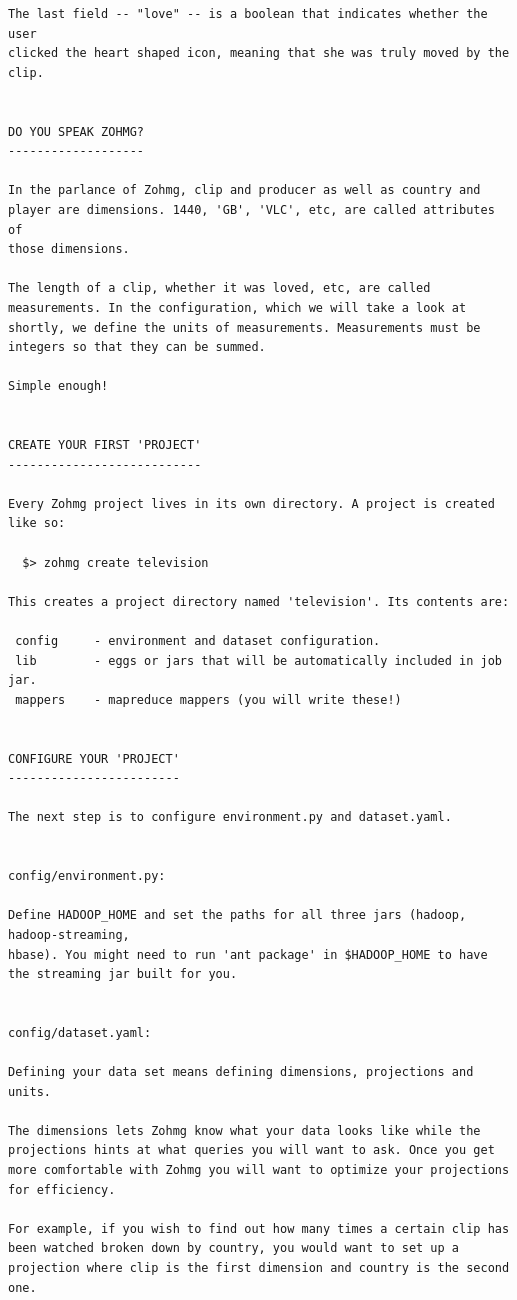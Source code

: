 \begin{verbatim}
The last field -- "love" -- is a boolean that indicates whether the user
clicked the heart shaped icon, meaning that she was truly moved by the
clip.


DO YOU SPEAK ZOHMG?
-------------------

In the parlance of Zohmg, clip and producer as well as country and
player are dimensions. 1440, 'GB', 'VLC', etc, are called attributes of
those dimensions.

The length of a clip, whether it was loved, etc, are called
measurements. In the configuration, which we will take a look at
shortly, we define the units of measurements. Measurements must be
integers so that they can be summed.

Simple enough!


CREATE YOUR FIRST 'PROJECT'
---------------------------

Every Zohmg project lives in its own directory. A project is created
like so:

  $> zohmg create television

This creates a project directory named 'television'. Its contents are:

 config     - environment and dataset configuration.
 lib        - eggs or jars that will be automatically included in job jar.
 mappers    - mapreduce mappers (you will write these!)


CONFIGURE YOUR 'PROJECT'
------------------------

The next step is to configure environment.py and dataset.yaml.


config/environment.py:

Define HADOOP_HOME and set the paths for all three jars (hadoop, hadoop-streaming,
hbase). You might need to run 'ant package' in $HADOOP_HOME to have
the streaming jar built for you.


config/dataset.yaml:

Defining your data set means defining dimensions, projections and
units.

The dimensions lets Zohmg know what your data looks like while the
projections hints at what queries you will want to ask. Once you get
more comfortable with Zohmg you will want to optimize your projections
for efficiency.

For example, if you wish to find out how many times a certain clip has
been watched broken down by country, you would want to set up a
projection where clip is the first dimension and country is the second
one.


\end{verbatim}
